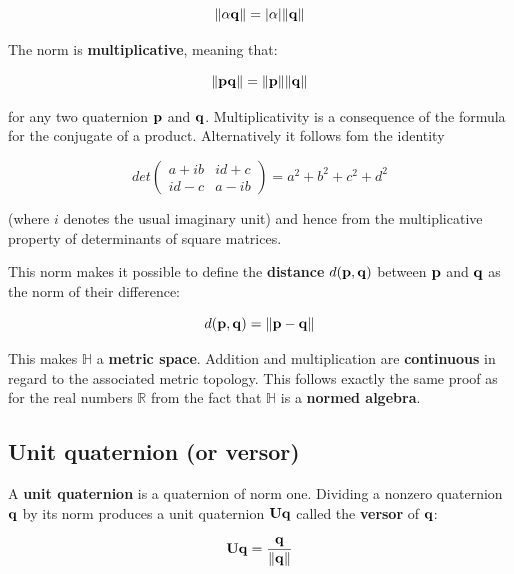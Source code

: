 \begin{equation}
    \| {\alpha \mathbf{q}} \| = | {\alpha} | \| {\mathbf{q}} \|
\end{equation}

The norm is \textbf{multiplicative}, meaning that:

\begin{equation}
    \| {\mathbf{p} \mathbf{q}} \| = \| {\mathbf{p}} \| \| {\mathbf{q}} \|
\end{equation}

for any two quaternion $ \mathbf{p} $ and $ \mathbf{q} $. Multiplicativity is a consequence of the
formula for the conjugate of a product. Alternatively it follows fom the identity

\begin{equation}
    det \left( \begin{matrix}
            a + i b & id + c \\
            id - c & a - ib
          \end{matrix} \right) = a^2 + b^2 + c^2 + d^2
\end{equation}

(where $ i $ denotes the usual imaginary unit) and hence from the multiplicative
property of determinants of square matrices.

This norm makes it possible to define the \textbf{distance} $ d(\mathbf{p},\mathbf{q}) $
between $ \mathbf{p} $ and $ \mathbf{q} $ as the norm of their difference:

\begin{equation}
    d(\mathbf{p},\mathbf{q}) = \| {\mathbf{p} - \mathbf{q}} \|
\end{equation}

This makes $ \mathbb{H} $ a \textbf{metric space}. Addition and multiplication are
\textbf{continuous} in regard to the associated metric topology. This
follows exactly the same proof as for the real numbers $ \mathbb{R} $ from the
fact that $ \mathbb{H} $ is a \textbf{normed algebra}.


\subsection{Unit quaternion (or versor)}

A \textbf{unit quaternion} is a quaternion of norm one. Dividing a nonzero quaternion
$ \mathbf{q} $ by its norm produces a unit quaternion $ \mathbf{Uq} $ called the \textbf{versor}
of $ \mathbf{q} $:

\begin{equation}
    \mathbf{Uq} = \frac{\mathbf{q}} {\| {\mathbf{q}} \|}
\end{equation}

